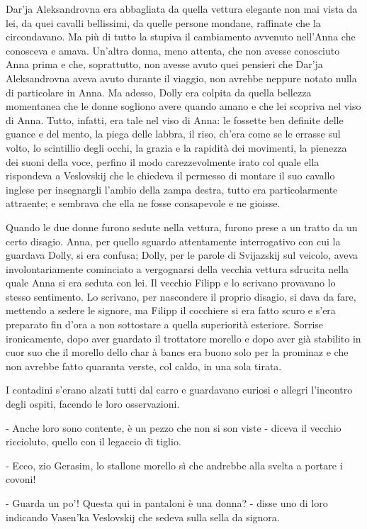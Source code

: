 Dar'ja Aleksandrovna era abbagliata da quella vettura elegante non mai vista da lei, da quei cavalli bellissimi, da quelle persone mondane, raffinate che la circondavano. Ma più di tutto la stupiva il cambiamento avvenuto nell'Anna che conosceva e amava. Un'altra donna, meno attenta, che non avesse conosciuto Anna prima e che, soprattutto, non avesse avuto quei pensieri che Dar'ja Aleksandrovna aveva avuto durante il viaggio, non avrebbe neppure notato nulla di particolare in Anna. Ma adesso, Dolly era colpita da quella bellezza momentanea che le donne sogliono avere quando amano e che lei scopriva nel viso di Anna. Tutto, infatti, era tale nel viso di Anna: le fossette ben definite delle guance e del mento, la piega delle labbra, il riso, ch'era come se le errasse sul volto, lo scintillio degli occhi, la grazia e la rapidità dei movimenti, la pienezza dei suoni della voce, perfino il modo carezzevolmente irato col quale ella rispondeva a Veslovskij che le chiedeva il permesso di montare il suo cavallo inglese per insegnargli l'ambio della zampa destra, tutto era particolarmente attraente; e sembrava che ella ne fosse consapevole e ne gioisse. 

Quando le due donne furono sedute nella vettura, furono prese a un tratto da un certo disagio. Anna, per quello sguardo attentamente interrogativo con cui la guardava Dolly, si era confusa; Dolly, per le parole di Svijazskij sul veicolo, aveva involontariamente cominciato a vergognarsi della vecchia vettura sdrucita nella quale Anna si era seduta con lei. Il vecchio Filipp e lo scrivano provavano lo stesso sentimento. Lo scrivano, per nascondere il proprio disagio, si dava da fare, mettendo a sedere le signore, ma Filipp il cocchiere si era fatto scuro e s'era preparato fin d'ora a non sottostare a quella superiorità esteriore. Sorrise ironicamente, dopo aver guardato il trottatore morello e dopo aver già stabilito in cuor suo che il morello dello char à bancs era buono solo per la prominaz e che non avrebbe fatto quaranta verste, col caldo, in una sola tirata. 

I contadini s'erano alzati tutti dal carro e guardavano curiosi e allegri l'incontro degli ospiti, facendo le loro osservazioni. 

- Anche loro sono contente, è un pezzo che non si son viste - diceva il vecchio riccioluto, quello con il legaccio di tiglio. 

- Ecco, zio Gerasim, lo stallone morello sì che andrebbe alla svelta a portare i covoni! 

- Guarda un po'! Questa qui in pantaloni è una donna? - disse uno di loro indicando Vasen'ka Veslovskij che sedeva sulla sella da signora. 

